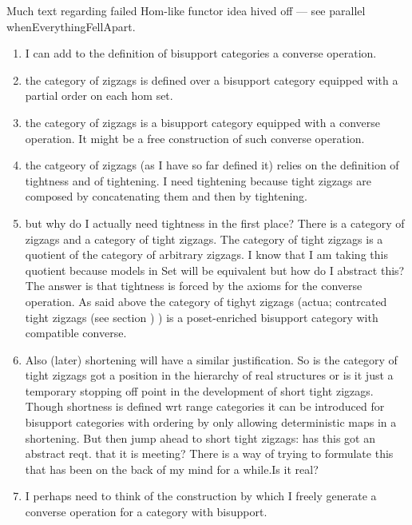 \begin{aside}
Much text regarding failed Hom-like functor idea hived off --- see
parallel whenEverythingFellApart.
\end{aside}

\begin{aside}
\begin{enumerate}
\item 
I can add to the definition of bisupport categories a converse operation.
\item the category of zigzags is defined over a bisupport category equipped with a partial order on each hom set.
\item the category of zigzags  is a bisupport category equipped with a converse operation. It might be a free construction of such converse operation.
\item the catgeory of zigzags (as I have so far defined it) relies on the definition of tightness and of tightening. I need tightening because tight zigzags are composed by concatenating them and then by tightening.
\item but why do I actually need tightness in the first place? 
There is a category of zigzags and a category of tight zigzags. The category of tight zigzags is a quotient of the category of arbitrary zigzags. I know that I am taking this quotient because models in Set will be equivalent but how do I abstract this? The answer is that tightness is forced by the axioms for the converse operation. As said above the category of tighyt zigzags (actua; contrcated tight zigzags (see section ) ) is a poset-enriched bisupport category with compatible converse.

\item Also (later) shortening will have a similar 
justification. So is the category of tight zigzags got a position in the hierarchy of real structures or is it just a temporary stopping off point in the development of short tight zigzags. Though shortness is defined wrt range categories it can be introduced for bisupport categories with ordering by only allowing deterministic maps in a shortening. But then jump ahead to short tight zigzags: has this got an abstract reqt. that it is meeting? There is a way of trying to formulate this that has been on the back of my mind for a while.Is it real? 
\item I perhaps need to think of the construction by which I freely generate a converse operation for a category with bisupport.
\end{enumerate}
\end{aside}

